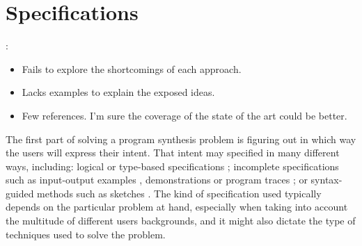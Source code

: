 \section{Specifications}
\label{sec:specifications}

:
\begin{itemize}
\item Fails to explore the shortcomings of each approach.
\item Lacks examples to explain the exposed ideas.
\item Few references. I'm sure the coverage of the state of the art could be
  better.
\end{itemize}

The first part of solving a program synthesis problem is figuring out in which
way the users will express their intent.
That intent may specified in many different ways, including:
  logical \cite{Itzhaky:SIS:2010}
  or type-based specifications \cite{Osera:2015:TPS, Frankle:2016:EST,
    Polikarpova:2016:PSP};
  incomplete specifications such as
  input-output examples \cite{Frankle:2016:EST, Gulwani:2012:SDM, Leung:2015:IPS},
  demonstrations \cite{Lau2003}
  or program traces \cite{Lau:traces:2003};
  or syntax-guided methods such as sketches \cite{Solar-Lezama:2008, Alur:sygus:2013}.
The kind of specification used typically depends on the particular problem at
hand, especially when taking into account the multitude of different users
backgrounds, and it might also dictate the type of techniques used to solve the
problem.




% 

